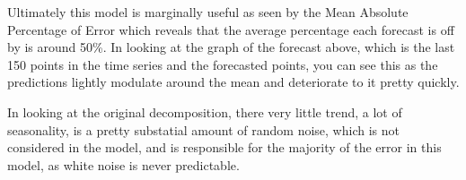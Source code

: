 \documentclass[openany]{book}
\begin{document}
Ultimately this model is marginally useful as seen by the Mean Absolute
Percentage of Error which reveals that the average percentage each
forecast is off by is around 50\%. In looking at the graph of the
forecast above, which is the last 150 points in the time series and the
forecasted points, you can see this as the predictions lightly modulate
around the mean and deteriorate to it pretty quickly.

In looking at the original decomposition, there very little trend, a lot
of seasonality, is a pretty substatial amount of random noise, which is
not considered in the model, and is responsible for the majority of the
error in this model, as white noise is never predictable.
\end{document}
